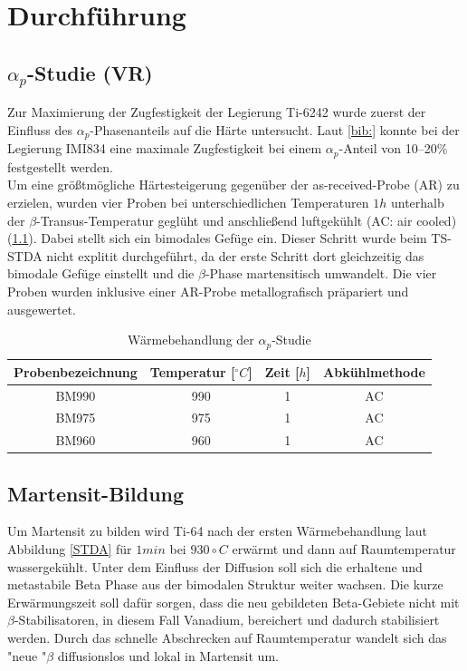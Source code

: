 \chapter{Durchführung}

\section{$\alpha_p$-Studie (VR)}
Zur Maximierung der Zugfestigkeit der Legierung Ti-6242 wurde zuerst der Einfluss des $\alpha_p$-Phasenanteils auf die Härte untersucht. Laut \ref{bib:} konnte bei der Legierung IMI834 eine maximale Zugfestigkeit bei einem $\alpha_p$-Anteil von 10--20\% festgestellt werden. \\
Um eine größtmögliche Härtesteigerung gegenüber der as-received-Probe (AR) zu erzielen, wurden vier Proben bei unterschiedlichen Temperaturen $1h$ unterhalb der $\beta$-Transus-Temperatur geglüht und anschließend luftgekühlt (AC: air cooled) (\ref{tab:alphap}). Dabei stellt sich ein bimodales Gefüge ein. Dieser Schritt wurde beim TS-STDA nicht explitit durchgeführt, da der erste Schritt dort gleichzeitig das bimodale Gefüge einstellt und die $\beta$-Phase martensitisch umwandelt. Die vier Proben wurden inklusive einer AR-Probe metallografisch präpariert und ausgewertet.



\begin{table}
		\centering
	\begin{tabular}{|c|c|c|c|}
	\hline 
	Probenbezeichnung & Temperatur [$^\circ C$] & Zeit [$h$] & Abkühlmethode \\ 
	\hline 
	BM990 & 990 & 1 & AC\\ 
	\hline 
	
	BM975 & 975 & 1 & AC\\ 
	\hline 
	BM960 & 960 & 1 & AC\\ 
	\hline 
	\end{tabular} 
	\caption{Wärmebehandlung der $\alpha_p$-Studie}
	\label{tab:alphap}
\end{table}


\section{Martensit-Bildung}

Um Martensit zu bilden wird Ti-64 nach der ersten Wärmebehandlung laut Abbildung \ref{STDA} für $1 min$  bei $930\circ C$ erwärmt und dann  auf Raumtemperatur wassergekühlt. Unter dem Einfluss der Diffusion soll sich die erhaltene und metastabile Beta Phase aus der bimodalen Struktur weiter wachsen. Die kurze Erwärmungszeit soll dafür sorgen, dass die neu gebildeten Beta-Gebiete nicht mit $\beta$-Stabilisatoren, in diesem Fall Vanadium, bereichert  und dadurch stabilisiert werden. Durch das schnelle Abschrecken auf Raumtemperatur wandelt sich das "neue "$\beta$ diffusionslos und lokal in Martensit um.

